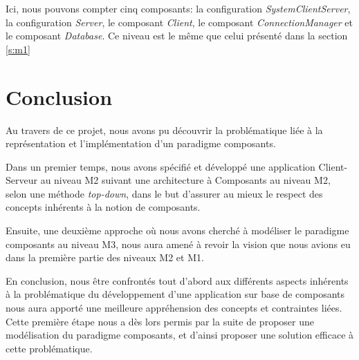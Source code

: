 \documentclass[french,a4paper,titlepage]{article}
\begin{document}
		
		Ici, nous pouvons compter cinq composants: la configuration
		\emph{SystemClientServer}, la configuration \emph{Server}, le composant
		\emph{Client}, le composant \emph{ConnectionManager} et le composant
		\emph{Database}. Ce niveau est le même que celui présenté dans la section
		\ref{s:m1}
		
	\section*{Conclusion}
	
	Au travers de ce projet, nous avons pu découvrir la problématique liée à la
	représentation et l'implémentation d'un paradigme composants.
	
	Dans un premier temps, nous avons spécifié et développé une application
	Client-Serveur au niveau M2 suivant une architecture à Composants au niveau
	M2, selon une méthode \emph{top-down}, dans le but d'assurer au mieux le
	respect des concepts inhérents à la notion de composants.
	
	Ensuite, une deuxième approche où nous avons cherché à modéliser le paradigme
	composants au niveau M3, nous aura amené à revoir la vision que nous avions eu
	dans la première partie des niveaux M2 et M1.
	
	En conclusion, nous être confrontés tout d'abord aux différents aspects
	inhérents à la problématique du développement d'une application sur base de
	composants nous aura apporté une meilleure appréhension des concepts et
	contraintes liées. Cette première étape nous a dès lors permis par la suite de
	proposer une modélisation du paradigme composants, et d'ainsi proposer une
	solution efficace à cette problématique.
	
\end{document}
